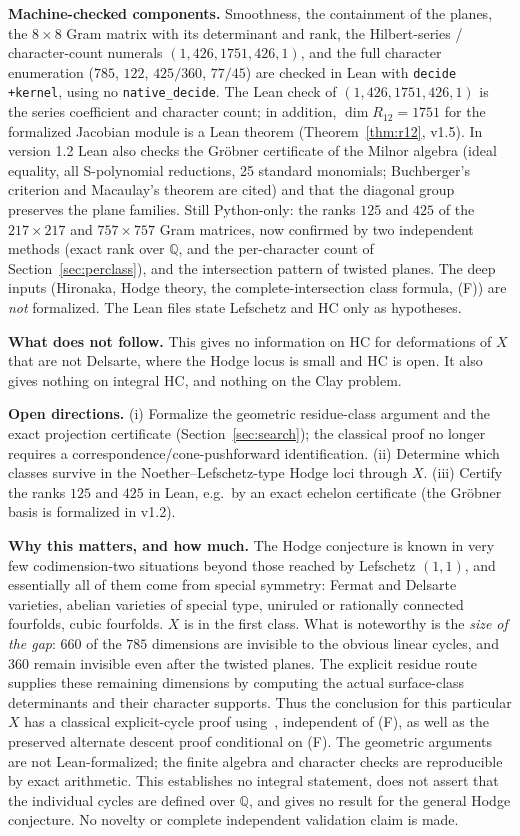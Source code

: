 \documentclass[11pt]{amsart}
\theoremstyle{remark}\newtheorem{remark}[theorem]{Remark}
\newcommand{\Q}{\mathbb{Q}}\newcommand{\PP}{\mathbb{P}}
\begin{document}
\textbf{Machine-checked components.} Smoothness, the containment of the
planes, the $8\times8$ Gram matrix with its determinant and rank, the
Hilbert-series / character-count numerals $(1,426,1751,426,1)$, and the full
character enumeration ($785$, $122$, $425/360$, $77/45$) are checked in Lean
with \texttt{decide +kernel}, using no \texttt{native\_decide}.
The Lean check of $(1,426,1751,426,1)$ is the series coefficient and
character count; in addition, $\dim R_{12}=1751$ for the formalized Jacobian module
is a Lean theorem (Theorem~\ref{thm:r12}, v1.5). In version 1.2 Lean also checks the Gr\"obner certificate of the
Milnor algebra (ideal equality, all S-polynomial reductions, 25 standard monomials; Buchberger's
criterion and Macaulay's theorem are cited) and that the diagonal group preserves the plane families.
Still Python-only: the ranks $125$ and $425$ of the $217\times217$ and $757\times757$ Gram matrices,
now confirmed by two independent methods (exact rank over $\Q$, and the per-character count of
Section~\ref{sec:perclass}), and the intersection pattern of twisted planes. The deep inputs (Hironaka, Hodge theory, the complete-intersection class formula, (F)) are \emph{not}
formalized. The Lean files state Lefschetz and HC only as hypotheses.

\textbf{What does not follow.} This gives no information on HC for deformations of $X$ that are
not Delsarte, where the Hodge locus is small and HC is open. It also gives nothing on integral
HC, and nothing on the Clay problem.

\textbf{Open directions.} (i) Formalize the geometric residue-class argument and the exact projection certificate (Section~\ref{sec:search}); the classical proof no longer requires a correspondence/cone-pushforward identification. (ii) Determine which classes survive in the Noether--Lefschetz-type Hodge loci
through $X$. (iii) Certify the ranks $125$ and $425$ in Lean, e.g.\ by an exact echelon
certificate (the Gr\"obner basis is formalized in v1.2).

\textbf{Why this matters, and how much.} The Hodge conjecture is known in very few
codimension-two situations beyond those reached by Lefschetz $(1,1)$, and essentially all of them
come from special symmetry: Fermat and Delsarte varieties, abelian varieties of special type,
uniruled or rationally connected fourfolds, cubic fourfolds. $X$ is in the first class. What is
noteworthy is the \emph{size of the gap}: $660$ of the $785$ dimensions are invisible to the obvious
linear cycles, and $360$ remain invisible even after the twisted planes. The explicit residue route supplies these remaining dimensions by
computing the actual surface-class determinants and their character supports.
Thus the conclusion for this particular $X$ has a classical explicit-cycle proof
using~\cite{VL}, independent of (F), as well as the preserved alternate descent
proof conditional on (F). The geometric arguments are not Lean-formalized;
the finite algebra and character checks are reproducible by exact arithmetic.
This establishes no integral statement, does not assert that the individual
cycles are defined over $\Q$, and gives no result for the general Hodge conjecture.
No novelty or complete independent validation claim is made.
\end{document}
